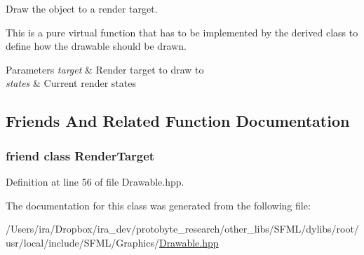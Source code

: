 Draw the object to a render target. 

This is a pure virtual function that has to be implemented by the derived class to define how the drawable should be drawn.


\begin{DoxyParams}{Parameters}
{\em target} & Render target to draw to \\
\hline
{\em states} & Current render states \\
\hline
\end{DoxyParams}


\subsection{Friends And Related Function Documentation}
\hypertarget{classsf_1_1_drawable_aa5afc6f82b7b587ed5ada4d227ce32aa}{
\subsubsection[{Render\-Target}]{\setlength{\rightskip}{0pt plus 5cm}friend class {\bf Render\-Target}\hspace{0.3cm}{\ttfamily [friend]}}}\label{classsf_1_1_drawable_aa5afc6f82b7b587ed5ada4d227ce32aa}


Definition at line 56 of file Drawable.\-hpp.



The documentation for this class was generated from the following file\-:\begin{DoxyCompactItemize}
\item 
/\-Users/ira/\-Dropbox/ira\-\_\-dev/protobyte\-\_\-research/other\-\_\-libs/\-S\-F\-M\-L/dylibs/root/usr/local/include/\-S\-F\-M\-L/\-Graphics/\hyperlink{_drawable_8hpp}{Drawable.\-hpp}\end{DoxyCompactItemize}
